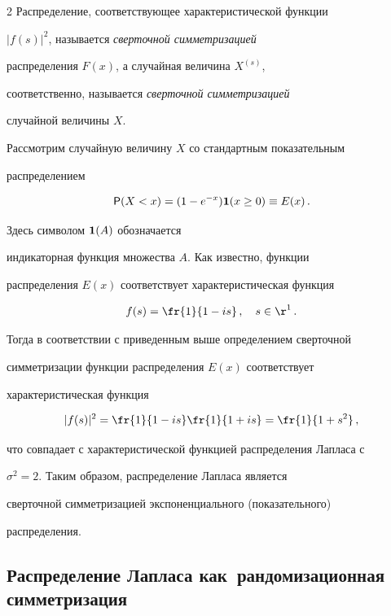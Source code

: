 \begin{multicols}{2}
Распределение, соответствующее характеристической функции


$|f(s)|^2$, называется {\it сверточной симметризацией}


распределения $F(x)$, а случайная величина $ X^{(s)}$,


соответственно, называется {\it сверточной симметризацией}


случайной величины $X$.





Рассмотрим случайную величину $X$ со стандартным показательным


распределением


\begin{equation}


{\sf P}( X<x)=(1-e^{-x})\I(x\ge0)\equiv E(x)\,.\label{2.1b}


\end{equation}


Здесь символом ${\bf 1}(A)$ обозначается


индикаторная функция множества $A$. Как известно, функции


распределения $E(x)$ соответствует характеристическая функция


$$


f(s)=\fr{1}{1-is}\,,\quad s\in{\r}^1\,.


$$


Тогда в соответствии с приведенным выше определением сверточной


симметризации функции распределения $E(x)$ соответствует


характеристическая функция


$$


|f(s)|^2=\fr{1}{1-is} \fr{1}{1+is}=\fr{1}{1+s^2}\,,


$$


что совпадает с характеристической функцией распределения Лапласа с


$\sigma^2=2$. Таким образом, распределение Лапласа является


сверточной симметризацией экспоненциального (показательного)


распределения.










\subsection{Распределение Лапласа как~рандомизационная симметризация}






\end{multicols}
